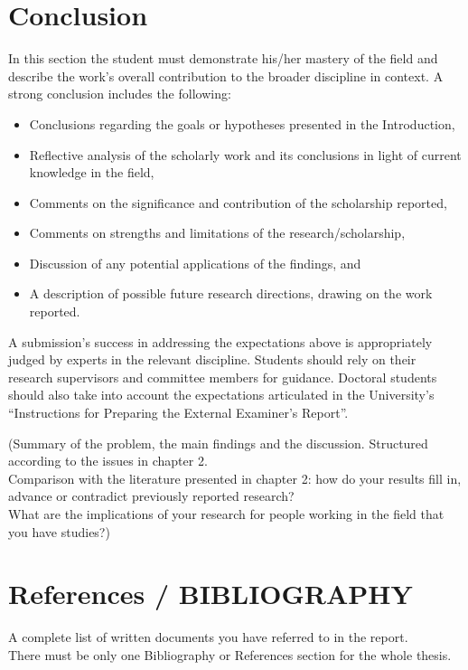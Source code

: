 \chapter{Conclusion}
  In this section the student must demonstrate his/her mastery of the field and 
    describe the work's overall contribution to the broader discipline in context. A strong 
    conclusion includes the following:
    \begin{itemize}
      \item Conclusions regarding the goals or hypotheses presented in the Introduction,
      \item Reflective analysis of the scholarly work and its conclusions in light of current 
        knowledge in the field,
      \item Comments on the significance and contribution of the scholarship reported,
      \item Comments on strengths and limitations of the research/scholarship,
      \item Discussion of any potential applications of the findings, and
      \item A description of possible future research directions, drawing on the work reported.
    \end{itemize}
    A submission's success in addressing the expectations above is appropriately judged by experts 
      in the relevant discipline. Students should rely on their research supervisors and committee 
      members for guidance. Doctoral students should also take into account the expectations 
      articulated in the University's “Instructions for Preparing the External Examiner's Report”.

  (Summary of the problem, the main findings and the discussion. Structured according to the issues 
    in chapter 2. \\
  Comparison with the literature presented in chapter 2: how do your results fill in, advance or 
    contradict previously reported research? \\
  What are the implications of your research for people working in the field that you have studies?)
  
\chapter{References / BIBLIOGRAPHY}
  A complete list of written documents you have referred to in the report. \\
  There must be only one Bibliography or References section for the whole thesis.

